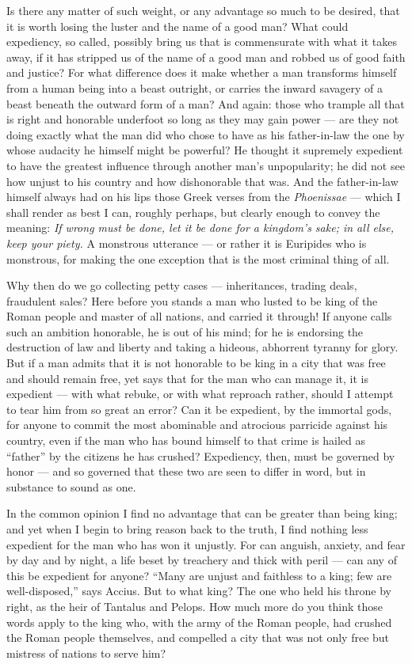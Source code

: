  Is there any matter of such weight, or any advantage so much to be desired, that it is worth losing the luster and the name of a good man? What could expediency, so called, possibly bring us that is commensurate with what it takes away, if it has stripped us of the name of a good man and robbed us of good faith and justice? For what difference does it make whether a man transforms himself from a human being into a beast outright, or carries the inward savagery of a beast beneath the outward form of a man? And again: those who trample all that is right and honorable underfoot so long as they may gain power — are they not doing exactly what the man did who chose to have as his father-in-law the one by whose audacity he himself might be powerful? He thought it supremely expedient to have the greatest influence through another man's unpopularity; he did not see how unjust to his country and how dishonorable that was. And the father-in-law himself always had on his lips those Greek verses from the \textit{Phoenissae} — which I shall render as best I can, roughly perhaps, but clearly enough to convey the meaning: \textit{If wrong must be done, let it be done for a kingdom's sake; in all else, keep your piety.} A monstrous utterance — or rather it is Euripides who is monstrous, for making the one exception that is the most criminal thing of all.

 Why then do we go collecting petty cases — inheritances, trading deals, fraudulent sales? Here before you stands a man who lusted to be king of the Roman people and master of all nations, and carried it through! If anyone calls such an ambition honorable, he is out of his mind; for he is endorsing the destruction of law and liberty and taking a hideous, abhorrent tyranny for glory. But if a man admits that it is not honorable to be king in a city that was free and should remain free, yet says that for the man who can manage it, it is expedient — with what rebuke, or with what reproach rather, should I attempt to tear him from so great an error? Can it be expedient, by the immortal gods, for anyone to commit the most abominable and atrocious parricide against his country, even if the man who has bound himself to that crime is hailed as ``father'' by the citizens he has crushed? Expediency, then, must be governed by honor — and so governed that these two are seen to differ in word, but in substance to sound as one.

 In the common opinion I find no advantage that can be greater than being king; and yet when I begin to bring reason back to the truth, I find nothing less expedient for the man who has won it unjustly. For can anguish, anxiety, and fear by day and by night, a life beset by treachery and thick with peril — can any of this be expedient for anyone? ``Many are unjust and faithless to a king; few are well-disposed,'' says Accius. But to what king? The one who held his throne by right, as the heir of Tantalus and Pelops. How much more do you think those words apply to the king who, with the army of the Roman people, had crushed the Roman people themselves, and compelled a city that was not only free but mistress of nations to serve him?

